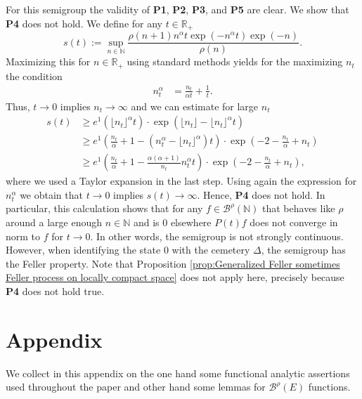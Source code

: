 \documentclass[a4paper,12pt]{article}
\theoremstyle{definition}
\theoremstyle{remark}
\numberwithin{equation}{section}
\numberwithin{theorem}{section}
\begin{document}
For this semigroup  the validity of \textbf{P1}, \textbf{P2},  \textbf{P3}, and \textbf{P5} are clear. We show that  \textbf{P4} does not hold. We define for any $t\in \mathbb{R}_+$ 
\[
 s(t):=\sup_{n \in \mathbb{N}} \frac{ \rho (n+1) n^{\alpha} t \exp (- n^{\alpha} t) \exp(-n)}{\rho (n)}. 
\] Maximizing this for $n \in \mathbb{R}_+$ using standard methods yields for the maximizing $n_t$ the condition
\begin{align*}
n_t^{\alpha}&=\frac{n_t}{\alpha t}+\frac{1}{t}. \end{align*}
Thus, $t\rightarrow 0$ implies $n_t \rightarrow \infty$ and we can estimate for large $n_t$
\begin{align*}
s(t) &\geq e^1\left(\lfloor n_t \rfloor^{\alpha}t\right)\cdot\exp\left(\lfloor n_t \rfloor-\lfloor n_t \rfloor^{\alpha}t\right)\\
&\geq e^1\left(\frac{n_t}{\alpha }+1-(n_t^{\alpha}-\lfloor n_t \rfloor^{\alpha})t\right)\cdot\exp\left(-2-\frac{n_t}{\alpha} +n_t\right)\\
&\geq e^1\left(\frac{n_t}{\alpha }+1-\frac{\alpha(\alpha +1)}{n_t}n_t^{\alpha}t\right)\cdot\exp\left(-2-\frac{n_t}{\alpha} +n_t\right),
\end{align*}
where we used a Taylor expansion in the last step. Using again the expression for $n_t^{\alpha}$ we obtain that $t\rightarrow 0$ implies $s(t)\rightarrow \infty$. Hence, \textbf{P4} does not hold. In particular, this calculation shows that for any $f\in \mathscr{B}^{\rho}(\mathbb{N})$ that behaves like $\rho$ around a large enough $n\in \mathbb{N}$ and is $0$ elsewhere $P(t)f$ does not converge in norm to $f$ for $t \rightarrow 0$. In other words, the semigroup is not strongly continuous. However, when identifying the state $0$ with the cemetery $\Delta$, the semigroup has the Feller property. Note that Proposition \ref{prop:Generalized Feller sometimes Feller process on locally compact space} does not apply here, precisely because \textbf{P4} does not hold true. 











\appendix
\section{Appendix}

We collect in this appendix on the one hand some functional analytic assertions used throughout the paper and other hand some lemmas for $\mathscr{B}^{\rho}(E)$ functions.
\end{document}
